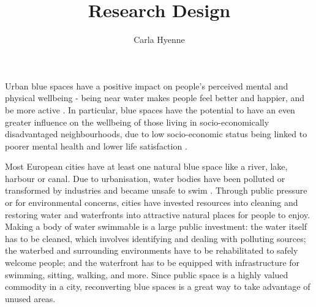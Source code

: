 \documentclass{article}
\title{Research Design}
\author{Carla Hyenne}
\date{}
\begin{document}
\maketitle


Urban blue spaces have a positive impact on people's perceived mental and physical wellbeing - being near water makes people feel better and happier, and be more active \parencite{gascon2017outdoor}. 
In particular, blue spaces have the potential to have an even greater influence on the wellbeing of those living in socio-economically disadvantaged neighbourhoods, due to low socio-economic status being linked to poorer mental health and lower life satisfaction \parencite{van2021urban}.

Most European cities have at least one natural blue space like a river, lake, harbour or canal. Due to urbanisation, water bodies have been polluted or transformed by industries and became unsafe to swim \parencite{kampa_langaas_anzaldua_2016}. Through public pressure or for environmental concerns, cities have invested resources into cleaning and restoring water and waterfronts into attractive natural places for people to enjoy.
Making a body of water swimmable is a large public investment: the water itself has to be cleaned, which involves identifying and dealing with polluting sources; the waterbed and surrounding environments have to be rehabilitated to safely welcome people; and the waterfront has to be equipped with infrastructure for swimming, sitting, walking, and more.
Since public space is a highly valued commodity in a city, reconverting blue spaces is a great way to take advantage of unused areas.
\end{document}
